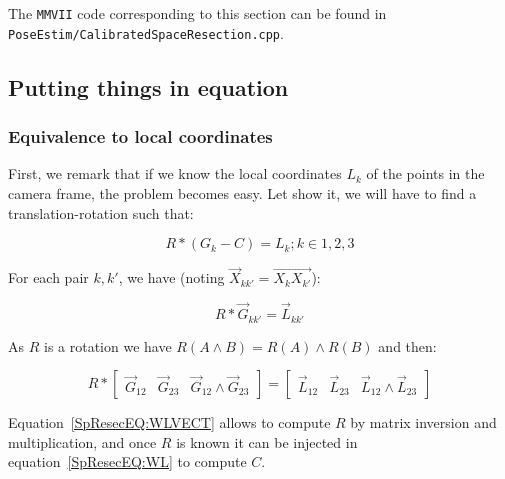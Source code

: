 The {\tt MMVII} code corresponding to this section can be found in 
{\tt PoseEstim/CalibratedSpaceResection.cpp}.


\subsection{Putting things in equation}

\subsubsection{Equivalence to local coordinates}

\label{SpRes:EquivLocCoord}

First, we remark that if we know the local coordinates $L_k$ of the points in the
camera frame, the problem becomes easy. Let show it, we will have to find a translation-rotation such that:

\begin{equation}
       R*(G_k-C) = L_k  ; k\in{1,2,3} \label{SpResecEQ:WL}
\end{equation}


For each pair $k,k'$, we have (noting $\Vec{X}_{kk'} = \overrightarrow{X_{k}X_{k'}} $):


\begin{equation}
	R* \Vec{G}_{kk'} =  \Vec{L}_{kk'} \label{SpResecEQ:WLVECT}
\end{equation}

As  $R$ is a rotation we have $R(A \wedge  B) = R(A) \wedge   R(B) $ and then:

\begin{equation}
	R* \begin{bmatrix} \Vec{G}_{12} & \Vec{G}_{23} &  \Vec{G}_{12} \wedge \Vec{G}_{23} \end{bmatrix} 
        =  \begin{bmatrix} \Vec{L}_{12} & \Vec{L}_{23} &  \Vec{L}_{12} \wedge \Vec{L}_{23} \end{bmatrix} 
        \label{SpResecEQ:WLVECT}
\end{equation}

Equation~\ref{SpResecEQ:WLVECT} allows to compute $R$ by matrix inversion and multiplication, and 
once $R$ is known it can be injected in equation~\ref{SpResecEQ:WL} to compute $C$.

